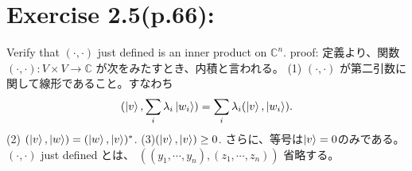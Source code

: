 \section{\Large Exercise 2.5(p.66):}
Verify that $(\cdot, \cdot)$ just defined is an inner product on $\mathbb{C}^n$.
\newline
\vspace{0.1in}
{\large proof:}
 定義より、関数$(\cdot, \cdot):V \times V \to \mathbb{C}$
が次をみたすとき、内積と言われる。
\newline
(1) $(\cdot, \cdot)$ が第二引数に関して線形であること。すなわち
\newline
\begin{eqnarray*}
 (\ket{v}, \sum_{i} \lambda_i \ket{w_i})
 = \sum_{i} \lambda_i (\ket{v}, \ket{w_i}).
\end{eqnarray*}
\newline
(2)
$(\ket{v}, \ket{w}) = (\ket{w}, \ket{v})^*$.
\newline
(3)$(\ket{v}, \ket{v}) \geq 0$.
さらに、等号は$\ket{v} = 0$のみである。
\newline
$(\cdot, \cdot)$ just defined とは、
$((y_1, \cdots, y_n), (z_1, \cdots, z_n)) $ 
省略する。
